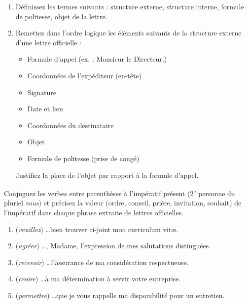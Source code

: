 \documentclass[11pt]{article}
\newcommand{\cle}[1]{{\popxbold\color{popdark}#1}}
\newcounter{popsec}
\newcounter{popsub}
\newcommand{\courssub}[1]{%
  \stepcounter{popsub}%
  \par\vspace{9pt}\noindent{\popxbold\fontsize{11.5}{13}\selectfont\color{popink}{\color{poporange}\thepopsec.\thepopsub}\hspace{6pt}#1}\par\nopagebreak\vspace{4pt}
}
\begin{document}
\begin{exercice}
\begin{enumerate}
    \item Définissez les termes suivants : \cle{structure externe}, \cle{structure interne}, \cle{formule de politesse}, \cle{objet de la lettre}.
    \item Remettez dans l'ordre logique les éléments suivants de la structure externe d'une lettre officielle :
    \begin{itemize}
        \item[1.] Formule d'appel (ex. : Monsieur le Directeur,)
        \item[2.] Coordonnées de l'expéditeur (en-tête)
        \item[3.] Signature
        \item[4.] Date et lieu
        \item[5.] Coordonnées du destinataire
        \item[6.] Objet
        \item[7.] Formule de politesse (prise de congé)
    \end{itemize}
    Justifiez la place de l'objet par rapport à la formule d'appel.
\end{enumerate}
\end{exercice}

\begin{exercice}
Conjuguez les verbes entre parenthèses à l'impératif présent (2\textsuperscript{e} personne du pluriel \emph{vous}) et précisez la \cle{valeur} (ordre, conseil, prière, invitation, souhait) de l'impératif dans chaque phrase extraite de lettres officielles.
\begin{enumerate}
    \item (\emph{veuillez}) \dots bien trouver ci-joint mon curriculum vitæ.
    \item (\emph{agréer}) \dots, Madame, l'expression de mes salutations distinguées.
    \item (\emph{recevoir}) \dots l'assurance de ma considération respectueuse.
    \item (\emph{croire}) \dots à ma détermination à servir votre entreprise.
    \item (\emph{permettre}) \dots que je vous rappelle ma disponibilité pour un entretien.
\end{enumerate}
\end{exercice}

\courssub{Je m'entraîne}
\end{document}
